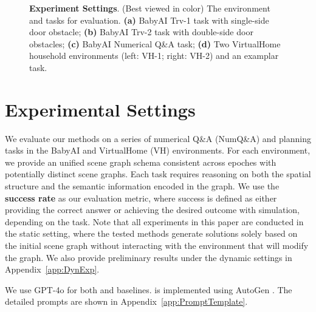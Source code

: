 \begin{figure*}[t!]
 
  \centering
  \vspace*{-0.1in}
  \caption{\textbf{Experiment Settings}. (Best viewed in color) The environment and tasks for evaluation.
  \textbf{(a)} BabyAI Trv-1 task with single-side door obstacle;
  \textbf{(b)} BabyAI Trv-2 task with double-side door obstacles;
  \textbf{(c)} BabyAI Numerical Q\&A task;
  \textbf{(d)} Two VirtualHome household environments (left: VH-1; right: VH-2) and an examplar task.
  }
  \vspace*{-0.15in}
 \label{fig:expSettings}
\end{figure*}

\section{Experimental Settings}

We evaluate our methods on a series of numerical Q\&A (NumQ\&A) and planning tasks in the BabyAI \citep{babyai, minigrid} and VirtualHome (VH) \citep{virtualhome} environments. For each environment, we provide an unified scene graph schema consistent across epoches with potentially distinct scene graphs. Each task requires reasoning on both the spatial structure and the semantic information encoded in the graph. We use the \textbf{success rate} as our evaluation metric, where success is defined as either providing the correct answer or achieving the desired outcome with simulation, depending on the task. 
Note that all experiments in this paper are conducted in the static setting, where the tested methods generate solutions solely based on the initial scene graph without interacting with the environment that will modify the graph. We also provide preliminary results under the dynamic settings in Appendix~\ref{app:DynExp}.

We use GPT-4o for both \RwR and baselines. \RwR is implemented using AutoGen \citep{autogen}. The detailed prompts are shown in Appendix~\ref{app:PromptTemplate}. 

